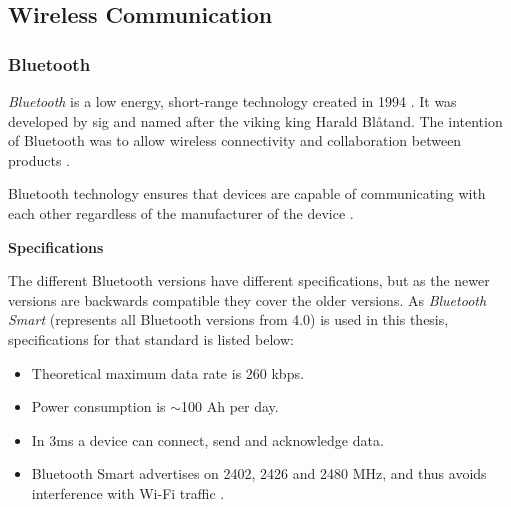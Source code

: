\subsection{Wireless Communication}
\subsubsection{Bluetooth}
\textit{Bluetooth} is a low energy, short-range technology created in 1994 \cite{ble2016}. It was developed by \acrshort{sig} and named after the viking king Harald Blåtand. The intention of Bluetooth was to allow wireless connectivity and collaboration between products \cite{bluetoothsig2016}.

Bluetooth technology ensures that devices are capable of communicating with each other regardless of the manufacturer of the device \cite{prabhu2004}.  

\textbf{Specifications}

The different Bluetooth versions have different specifications, but as the newer versions are backwards compatible \cite{bluetoothreport2013} they cover the older versions. As \textit{Bluetooth Smart} (represents all Bluetooth versions from 4.0) is used in this thesis, specifications for that standard is listed below:

\begin{itemize}
	\item Theoretical maximum data rate is 260 kbps.
	\item Power consumption is $\sim$100 \micro Ah per day.
	\item In 3ms a device can connect, send and acknowledge data.
	\item Bluetooth Smart advertises on 2402, 2426 and 2480 MHz, and thus avoids interference with Wi-Fi traffic \cite{csr2010}.
\end{itemize}